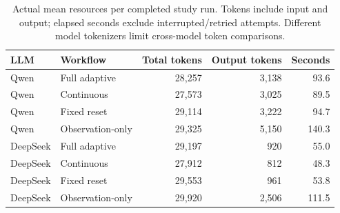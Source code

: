 \begin{table}[t]
\caption{Actual mean resources per completed study run. Tokens include input and output; elapsed seconds exclude interrupted/retried attempts. Different model tokenizers limit cross-model token comparisons.}\label{tab:eval-cost}
\centering\small
\begin{tabular*}{\textwidth}{@{\extracolsep{\fill}}llrrr@{}}\toprule
LLM & Workflow & Total tokens & Output tokens & Seconds\\\midrule
Qwen & Full adaptive & 28,257 & 3,138 & 93.6\\
Qwen & Continuous & 27,573 & 3,025 & 89.5\\
Qwen & Fixed reset & 29,114 & 3,222 & 94.7\\
Qwen & Observation-only & 29,325 & 5,150 & 140.3\\
\midrule
DeepSeek & Full adaptive & 29,197 & 920 & 55.0\\
DeepSeek & Continuous & 27,912 & 812 & 48.3\\
DeepSeek & Fixed reset & 29,553 & 961 & 53.8\\
DeepSeek & Observation-only & 29,920 & 2,506 & 111.5\\
\bottomrule\end{tabular*}
\end{table}
